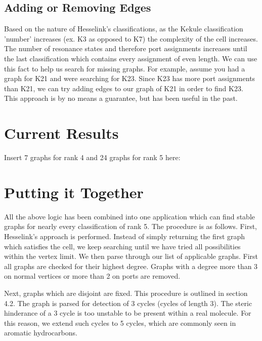 \documentclass[12pt]{article}
\begin{document}
\subsection{Adding or Removing Edges}

Based on the nature of Hesselink's classifications, as the Kekule classification 'number' increases (ex. K3 as opposed to K7) the complexity of the cell increases. The number of resonance states and therefore port assignments increases until the last classification which contains every assignment of even length. We can use this fact to help us search for missing graphs. For example, assume you had a graph for K21 and were searching for K23. Since K23 has more port assignments than K21, we can try adding edges to our graph of K21 in order to find K23. This approach is by no means a guarantee, but has been useful in the past.

\section{Current Results}

Insert 7 graphs for rank 4 and 24 graphs for rank 5 here: 
%


%

\section{Putting it Together}

All the above logic has been combined into one application which can find stable graphs for nearly every classification of rank 5. The procedure is as follows. First, Hesselink's approach is performed. Instead of simply returning the first graph which satisfies the cell, we keep searching until we have tried all possibilities within the vertex limit. We then parse through our list of applicable graphs. First all graphs are checked for their highest degree. Graphs with a degree more than 3 on normal vertices or more than 2 on ports are removed. 

Next, graphs which are disjoint are fixed. This procedure is outlined in section 4.2. The graph is parsed for detection of 3 cycles (cycles of length 3). The steric hinderance of a 3 cycle is too unstable to be present within a real molecule. For this reason, we extend such cycles to 5 cycles, which are commonly seen in aromatic hydrocarbons. 
\end{document}
